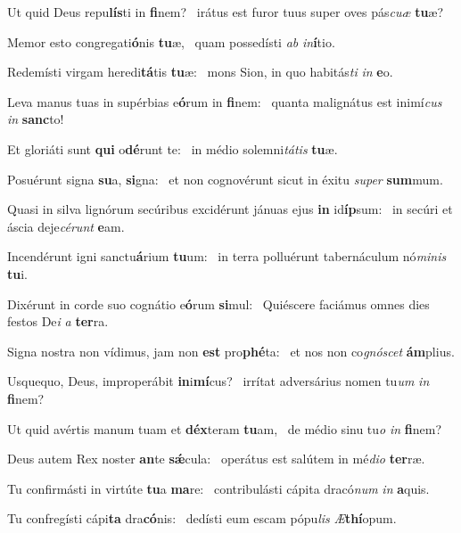 \item Ut quid Deus repu\textbf{lís}ti in \textbf{fi}nem?~\psstar{} irátus est furor tuus super oves pás\textit{cuæ} \textbf{tu}æ?
\item Memor esto congregati\textbf{ó}nis \textbf{tu}æ,~\psstar{} quam possedísti \textit{ab} \textit{in}\textbf{í}tio.
\item Redemísti virgam heredi\textbf{tá}tis \textbf{tu}æ:~\psstar{} mons Sion, in quo habitás\textit{ti} \textit{in} \textbf{e}o.
\item Leva manus tuas in supérbias e\textbf{ó}rum in \textbf{fi}nem:~\psstar{} quanta malignátus est inimí\textit{cus} \textit{in} \textbf{sanc}to!
\item Et gloriáti sunt \textbf{qui} o\textbf{dé}runt te:~\psstar{} in médio solemni\textit{tátis} \textbf{tu}æ.
\item Posuérunt signa \textbf{su}a, \textbf{si}gna:~\psstar{} et non cognovérunt sicut in éxitu \textit{super} \textbf{sum}mum.
\item Quasi in silva lignórum secúribus excidérunt jánuas ejus \textbf{in} id\textbf{íp}sum:~\psstar{} in secúri et áscia deje\textit{cérunt} \textbf{e}am.
\item Incendérunt igni sanctu\textbf{á}rium \textbf{tu}um:~\psstar{} in terra polluérunt tabernáculum nó\textit{minis} \textbf{tu}i.
\item Dixérunt in corde suo cognátio e\textbf{ó}rum \textbf{si}mul:~\psstar{} Quiéscere faciámus omnes dies festos De\textit{i} \textit{a} \textbf{ter}ra.
\item Signa nostra non vídimus, jam non \textbf{est} pro\textbf{phé}ta:~\psstar{} et nos non co\textit{gnóscet} \textbf{ám}plius.
\item Usquequo, Deus, improperábit \textbf{in}i\textbf{mí}cus?~\psstar{} irrítat adversárius nomen tu\textit{um} \textit{in} \textbf{fi}nem?
\item Ut quid avértis manum tuam et \textbf{déx}teram \textbf{tu}am,~\psstar{} de médio sinu tu\textit{o} \textit{in} \textbf{fi}nem?
\item Deus autem Rex noster \textbf{an}te \textbf{sǽ}cula:~\psstar{} operátus est salútem in mé\textit{dio} \textbf{ter}ræ.
\item Tu confirmásti in virtúte \textbf{tu}a \textbf{ma}re:~\psstar{} contribulásti cápita dracó\textit{num} \textit{in} \textbf{a}quis.
\item Tu confregísti cápi\textbf{ta} dra\-\textbf{có}\-nis:~\psstar{} dedísti eum escam pópu\textit{lis} \textit{Æ}\textbf{thí}opum.
